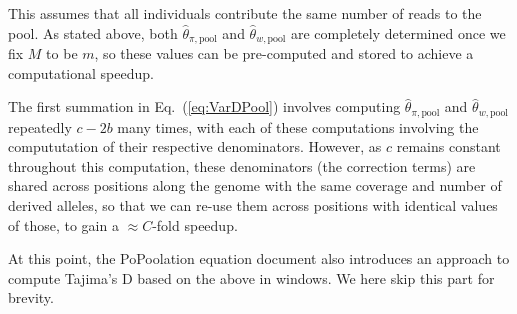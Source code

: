 \documentclass[a4paper,fontsize=9pt,DIV=14]{scrartcl}
\newcommand\eqnref[1]{Eq.~(\ref{#1})}
\begin{document}
This assumes that all individuals contribute the same number of reads to the pool.
As stated above, both $\widehat{\theta}_{\pi,\text{pool}}$ and $\widehat{\theta}_{w, \text{pool}}$ are completely determined once we fix $M$ to be $m$, so these values can be pre-computed and stored to achieve a computational speedup.

The first summation in \eqnref{eq:VarDPool} involves computing $\widehat{\theta}_{\pi,\text{pool}}$ and 
$\widehat{\theta}_{w,\text{pool}}$ repeatedly $c-2b$ many times, 
with each of these computations involving the compututation of their respective denominators.
However, as $c$ remains constant throughout this computation, these denominators (the correction terms)
are shared across positions along the genome with the same coverage and number of derived alleles, so that we can re-use them across positions with identical values of those, to gain a $\approx C$-fold speedup.

At this point, the PoPoolation equation document also introduces an approach to compute Tajima's D based on the above in windows.
We here skip this part for brevity.



\end{document}
